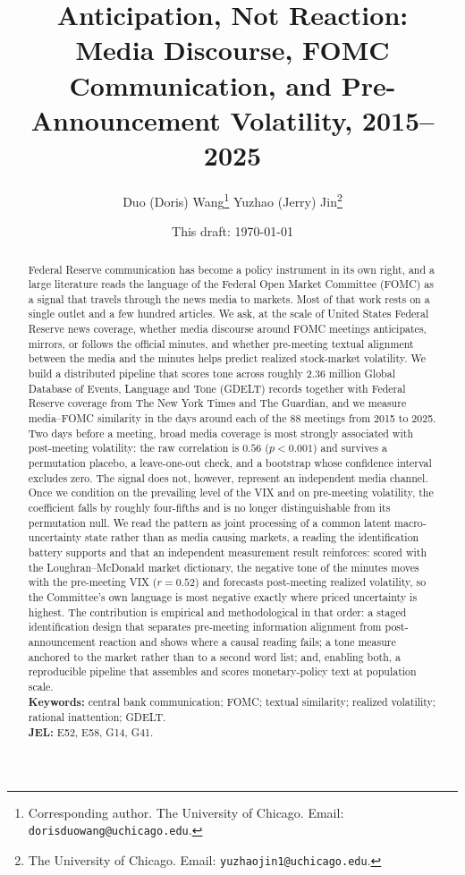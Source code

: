 \documentclass[11pt,a4paper]{article}
\title{\textbf{Anticipation, Not Reaction:}\\[3pt]
\large Media Discourse, FOMC Communication, and Pre-Announcement Volatility,
2015--2025}
\author{
Duo (Doris) Wang\thanks{Corresponding author. The University of Chicago. Email:
\texttt{dorisduowang@uchicago.edu}.}
\quad\quad
Yuzhao (Jerry) Jin\thanks{The University of Chicago. Email:
\texttt{yuzhaojin1@uchicago.edu}.}
}
\date{This draft: \today}
\begin{document}
\maketitle
\thispagestyle{fancy}

\begin{abstract}
\noindent
Federal Reserve communication has become a policy instrument in its own right,
and a large literature reads the language of the Federal Open Market Committee
(FOMC) as a signal that travels through the news media to markets. Most of that
work rests on a single outlet and a few hundred articles. We ask, at the scale of
United States Federal Reserve news coverage, whether media discourse around FOMC
meetings anticipates, mirrors, or follows the official minutes, and whether
pre-meeting textual alignment between the media and the minutes helps predict
realized stock-market volatility. We build a distributed pipeline that scores tone
across roughly 2.36 million Global Database of Events, Language and Tone (GDELT)
records together with Federal Reserve coverage from The New York Times and The
Guardian, and we measure media--FOMC similarity in the days around each of the
88 meetings from 2015 to 2025. Two days before a meeting, broad media coverage is
most strongly associated with post-meeting volatility: the raw correlation is
$0.56$ ($p<0.001$) and survives a permutation placebo, a leave-one-out check, and
a bootstrap whose confidence interval excludes zero. The signal does not, however,
represent an independent media channel. Once we condition on the prevailing level
of the VIX and on pre-meeting volatility, the coefficient falls by roughly
four-fifths and is no longer distinguishable from its permutation null. We read
the pattern as joint processing of a common latent macro-uncertainty state rather
than as media causing markets, a reading the identification battery supports and
that an independent measurement result reinforces: scored with the Loughran--McDonald
market dictionary, the negative tone of the minutes moves with the pre-meeting VIX
($r=0.52$) and forecasts post-meeting realized volatility, so the Committee's own
language is most negative exactly where priced uncertainty is highest. The
contribution is empirical and methodological in that order: a staged identification
design that separates pre-meeting information alignment from post-announcement
reaction and shows where a causal reading fails; a tone measure anchored to the
market rather than to a second word list; and, enabling both, a reproducible
pipeline that assembles and scores monetary-policy text at population scale.\\[6pt]
\noindent\textbf{Keywords:} central bank communication; FOMC; textual similarity;
realized volatility; rational inattention; GDELT.\\
\noindent\textbf{JEL:} E52, E58, G14, G41.
\end{abstract}
\end{document}
